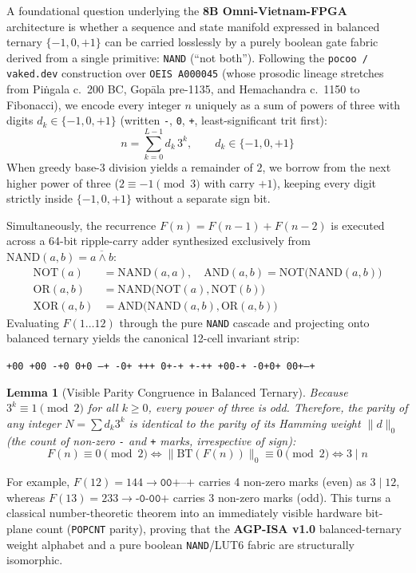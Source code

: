 \documentclass[10pt, twocolumn, a4paper]{article}
\newtheorem{lemma}{Lemma}
\begin{document}
A foundational question underlying the \textbf{8B Omni-Vietnam-FPGA} architecture is whether a sequence and state manifold expressed in balanced ternary $\{-1, 0, +1\}$ can be carried losslessly by a purely boolean gate fabric derived from a single primitive: \texttt{NAND} (``not both''). Following the \texttt{pocoo / vaked.dev} construction over \texttt{OEIS A000045} (whose prosodic lineage stretches from Pi\.ngala c.\ 200 BC, Gop\=ala pre-1135, and Hemachandra c.\ 1150 to Fibonacci), we encode every integer $n$ uniquely as a sum of powers of three with digits $d_k \in \{-1, 0, +1\}$ (written \texttt{-}, \texttt{0}, \texttt{+}, least-significant trit first):
\begin{equation}
n = \sum_{k=0}^{L-1} d_k \, 3^k, \qquad d_k \in \{-1, 0, +1\}
\end{equation}
When greedy base-3 division yields a remainder of $2$, we borrow from the next higher power of three ($2 \equiv -1 \pmod 3$ with carry $+1$), keeping every digit strictly inside $\{-1, 0, +1\}$ without a separate sign bit.

Simultaneously, the recurrence $F(n) = F(n-1) + F(n-2)$ is executed across a 64-bit ripple-carry adder synthesized exclusively from $\text{NAND}(a, b) = \overline{a \land b}$:
\begin{align}
\text{NOT}(a) &= \text{NAND}(a, a), \quad \text{AND}(a, b) = \text{NOT}\big(\text{NAND}(a, b)\big) \\
\text{OR}(a, b) &= \text{NAND}\big(\text{NOT}(a), \text{NOT}(b)\big) \\
\text{XOR}(a, b) &= \text{AND}\big(\text{NAND}(a, b), \text{OR}(a, b)\big)
\end{align}
Evaluating $F(1 \dots 12)$ through the pure \texttt{NAND} cascade and projecting onto balanced ternary yields the canonical 12-cell invariant strip:
\begin{center}
\texttt{+00 +00 -+0 0+0 --+ -0+ +++ 0+-+ +-++ +00-+ -0+0+ 00+--+}
\end{center}

\begin{lemma}[Visible Parity Congruence in Balanced Ternary]
Because $3^k \equiv 1 \pmod 2$ for all $k \ge 0$, every power of three is odd. Therefore, the parity of any integer $N = \sum d_k 3^k$ is identical to the parity of its Hamming weight $\|d\|_0$ (the count of non-zero \texttt{-} and \texttt{+} marks, irrespective of sign):
\begin{equation}
F(n) \equiv 0 \pmod 2 \iff \| \text{BT}(F(n)) \|_0 \equiv 0 \pmod 2 \iff 3 \mid n
\end{equation}
\end{lemma}
For example, $F(12) = 144 \to \texttt{00+--+}$ carries 4 non-zero marks (even) as $3 \mid 12$, whereas $F(13) = 233 \to \texttt{-0-00+}$ carries 3 non-zero marks (odd). This turns a classical number-theoretic theorem into an immediately visible hardware bit-plane count (\texttt{POPCNT} parity), proving that the \textbf{AGP-ISA v1.0} balanced-ternary weight alphabet and a pure boolean \texttt{NAND}/LUT6 fabric are structurally isomorphic.
\end{document}
